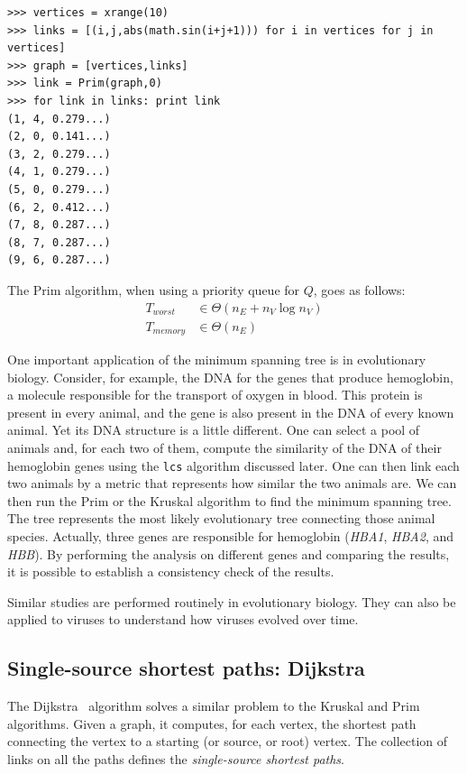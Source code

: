 \documentclass[justified,sixbynine]{tufte-book}
\def\ft{\small\tt}
\theoremstyle{plain}%
\theoremstyle{definition}
\theoremstyle{remark}
\begin{document}
\begin{fullwidth}
\begin{lstlisting}
>>> vertices = xrange(10)
>>> links = [(i,j,abs(math.sin(i+j+1))) for i in vertices for j in vertices]
>>> graph = [vertices,links]
>>> link = Prim(graph,0)
>>> for link in links: print link
(1, 4, 0.279...)
(2, 0, 0.141...)
(3, 2, 0.279...)
(4, 1, 0.279...)
(5, 0, 0.279...)
(6, 2, 0.412...)
(7, 8, 0.287...)
(8, 7, 0.287...)
(9, 6, 0.287...)
\end{lstlisting}

The Prim algorithm, when using a priority queue for $Q$, goes as follows:
\begin{align}
T_{worst} &\in \Theta (n_E+n_V\log n_V) \\
T_{memory} &\in \Theta (n_E)
\end{align}

One important application of the minimum spanning tree is in evolutionary biology. Consider, for example, the DNA for the genes that produce hemoglobin, a molecule responsible for the transport of oxygen in blood. This protein is present in every animal, and the gene is also present in the DNA of every known animal. Yet its DNA structure is a little different. One can select a pool of animals and, for each two of them, compute the similarity of the DNA of their hemoglobin genes using the {\ft lcs} algorithm discussed later. One can then link each two animals by a metric that represents how similar the two animals are. We can then run the Prim or the Kruskal algorithm to find the minimum spanning tree. The tree represents the most likely evolutionary tree connecting those animal species. Actually, three genes are responsible for hemoglobin ({\it HBA1}, {\it HBA2}, and {\it HBB}). By performing the analysis on different genes and comparing the results, it is possible to establish a consistency check of the results.~\cite{evolutionary}

Similar studies are performed routinely in evolutionary biology. They can also be applied to viruses to understand how viruses evolved over time.~\cite{korber}

\subsection{Single-source shortest paths: Dijkstra}


The Dijkstra~\cite{dijkstra} algorithm solves a similar problem to the Kruskal and Prim algorithms. Given a graph, it computes, for each vertex, the shortest path connecting the vertex to a starting (or source, or root) vertex. The collection of links on all the paths defines the {\it single-source shortest paths}.


\end{fullwidth}
\end{document}
